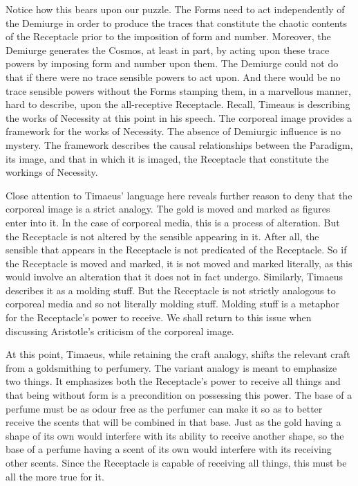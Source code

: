 Notice how this bears upon our puzzle. The Forms need to act independently of the Demiurge in order to produce the traces that constitute the chaotic contents of the Receptacle prior to the imposition of form and number. Moreover, the Demiurge generates the Cosmos, at least in part, by acting upon these trace powers by imposing form and number upon them. The Demiurge could not do that if there were no trace sensible powers to act upon. And there would be no trace sensible powers without the Forms stamping them, in a marvellous manner, hard to describe, upon the all-receptive Receptacle. Recall, Timeaus is describing the works of Necessity at this point in his speech. The corporeal image provides a framework for the works of Necessity. The absence of Demiurgic influence is no mystery. The framework describes the causal relationships between the Paradigm, its image, and that in which it is imaged, the Receptacle that constitute the workings of Necessity.

Close attention to Timaeus' language here reveals further reason to deny that the corporeal image is a strict analogy. The gold is moved and marked as figures enter into it. In the case of corporeal media, this is a process of alteration. But the Receptacle is not altered by the sensible appearing in it. After all, the sensible that appears in the Receptacle is not predicated of the Receptacle. So if the Receptacle is moved and marked, it is not moved and marked literally, as this would involve an alteration that it does not in fact undergo. Similarly, Timaeus describes it as a molding stuff. But the Receptacle is not strictly analogous to corporeal media and so not literally molding stuff. Molding stuff is a metaphor for the Receptacle's power to receive. We shall return to this issue when discussing Aristotle's criticism of the corporeal image.


At this point, Timaeus, while retaining the craft analogy, shifts the relevant craft from a goldsmithing to perfumery. The variant analogy is meant to emphasize two things. It emphasizes both the Receptacle's power to receive all things and that being without form is a precondition on possessing this power. The base of a perfume must be as odour free as the perfumer can make it so as to better receive the scents that will be combined in that base. Just as the gold having a shape of its own would interfere with its ability to receive another shape, so the base of a perfume having a scent of its own would interfere with its receiving other scents. Since the Receptacle is capable of receiving all things, this must be all the more true for it.

